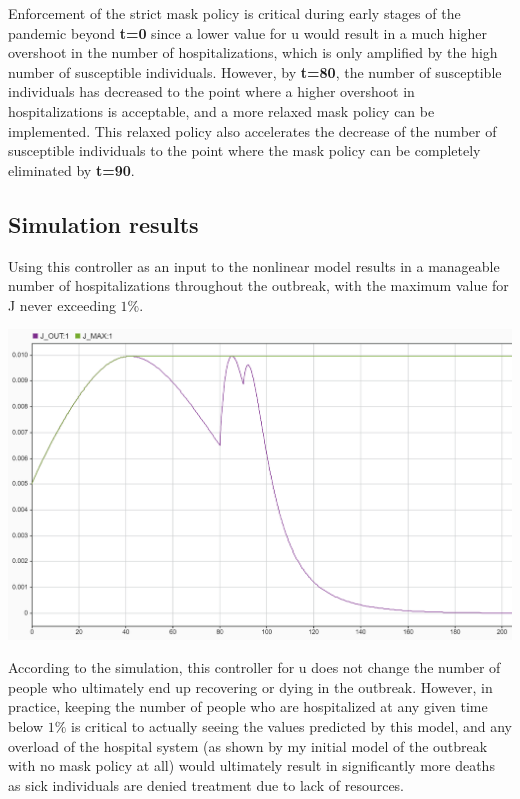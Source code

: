 \documentclass[fleqn]{article}
\begin{document}
Enforcement of the strict mask policy is critical during early stages of the pandemic beyond \textbf{t=0} since a lower value for u would result in a much higher overshoot in the number of hospitalizations, which is only amplified by the high number of susceptible individuals. However, by \textbf{t=80}, the number of susceptible individuals has decreased to the point where a higher overshoot in hospitalizations is acceptable, and a more relaxed mask policy can be implemented. This relaxed policy also accelerates the decrease of the number of susceptible individuals to the point where the mask policy can be completely eliminated by \textbf{t=90}. 

\subsection*{Simulation results}
Using this controller as an input to the nonlinear model results in a manageable number of hospitalizations throughout the outbreak, with the maximum value for J never exceeding $1\%$.

\begin{center}
    \includegraphics[width=0.8\linewidth]{controlled_outbreak_J_simulink}
\end{center}

\newpage

According to the simulation, this controller for u does not change the number of people who ultimately end up recovering or dying in the outbreak. However, in practice, keeping the number of people who are hospitalized at any given time below $1\%$ is critical to actually seeing the values predicted by this model, and any overload of the hospital system (as shown by my initial model of the outbreak with no mask policy at all) would ultimately result in significantly more deaths as sick individuals are denied treatment due to lack of resources.
\end{document}
